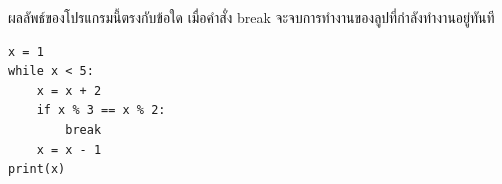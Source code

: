 ﻿%
\question ผลลัพธ์ของโปรแกรมนี้ตรงกับข้อใด เมื่อคำสั่ง break จะจบการทำงานของลูปที่กำลังทำงานอยู่ทันที
\begin{verbatim}
x = 1
while x < 5:
    x = x + 2
    if x % 3 == x % 2:
        break
    x = x - 1
print(x)
\end{verbatim}
